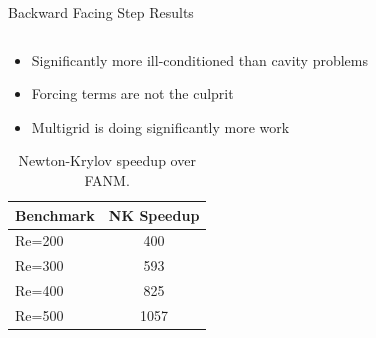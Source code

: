 \documentclass{beamer}
\begin{document}
\begin{frame}{Backward Facing Step Results}
\begin{columns}
    \begin{column}{0.4\textwidth}

      \begin{itemize}
      \item Significantly more ill-conditioned than cavity problems
      \item Forcing terms are not the culprit
      \item Multigrid is doing significantly more work
      \end{itemize}

      \bigskip

      \tiny{
        \begin{table}[h!]
          \begin{center}
            \begin{tabular}{lc}\hline\hline
              \multicolumn{1}{l}{Benchmark}& 
              \multicolumn{1}{c}{NK Speedup}\\
              \hline
              Re=200 & 400 \\
              Re=300 & 593 \\
              Re=400 & 825 \\
              Re=500 & 1057 \\
              \hline\hline
            \end{tabular}
          \end{center}
          \caption{Newton-Krylov speedup over FANM.}
        \end{table}
      }

    \end{column}
  \end{columns}

\end{frame}
\end{document}
